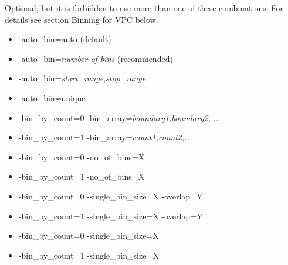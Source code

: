 Optional, but it is forbidden to use more than one of these combinations. For details see section Binning for VPC below.
\begin{itemize}
	\item -auto\_bin=auto   (default)
	\item -auto\_bin=\emph{number of bins} (recommended)
	\item -auto\_bin=\emph{start\_range},\emph{stop\_range}
	\item -auto\_bin=unique
	\item -bin\_by\_count=0 -bin\_array=\emph{boundary1,boundary2,...}
	\item -bin\_by\_count=1 -bin\_array=\emph{count1,count2,...}
	\item -bin\_by\_count=0 -no\_of\_bins=X
	\item -bin\_by\_count=1 -no\_of\_bins=X
	\item -bin\_by\_count=0 -single\_bin\_size=X -overlap=Y
	\item -bin\_by\_count=1 -single\_bin\_size=X -overlap=Y
	\item -bin\_by\_count=0 -single\_bin\_size=X
	\item -bin\_by\_count=1 -single\_bin\_size=X
\end{itemize}
